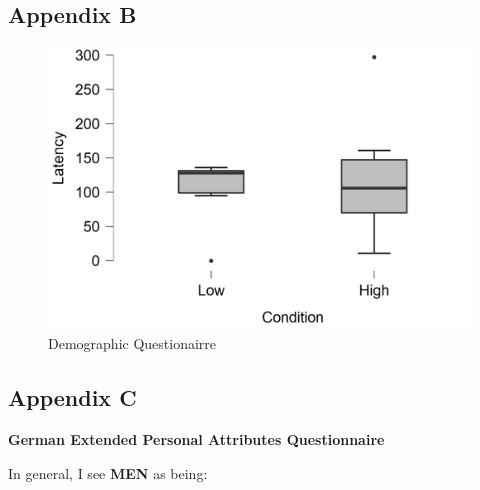 \documentclass[serif, authordate, twocolumn, empirical]{jote-article}
\begin{document}
\subsection*{\hypertarget{B}{Appendix B}} 
\begin{figure}[h]
	\centering
	\includegraphics[width=\columnwidth, trim={0 0 150px 0}, clip]{media/image2.png}
    \caption{Demographic Questionairre}
\end{figure}

\newpage
{}
{}
\subsection*{\hypertarget{C}{Appendix C}}

\textbf{German Extended Personal Attributes Questionnaire}


In general, I see \textbf{MEN} as being:\vspace{-0.7\baselineskip}
\end{document}

